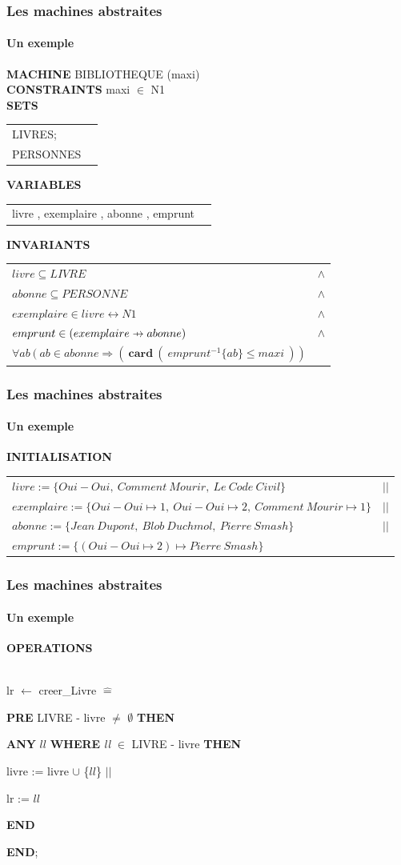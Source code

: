 \documentclass[11pt,a4paper,xcolor=table, handout]{beamer} %
\newcommand{\Bequal}{\mathrel{\widehat{=}}}
\def\p#1{\mathrel{\ooalign{\hfil$\mapstochar\mkern 5mu$\hfil\cr$#1$}}}
\def \pfun  {\p\rightarrow}
\begin{document}
\begin{frame}
\frametitle{Les machines abstraites}
\framesubtitle{Un exemple}
\setlength{\LTpre}{\medskipamount}
\setlength{\LTpost}{0pt}
\setlength\LTleft{\parindent}
\textbf{MACHINE}  BIBLIOTHEQUE (maxi) \\
\noindent\textbf{CONSTRAINTS} maxi $\in$ N1 \\
\noindent\textbf{SETS}
\begin{longtable}{ll} LIVRES; \\ PERSONNES\\ \end{longtable}
\noindent\textbf{VARIABLES}
\begin{longtable}{ll} livre , exemplaire , abonne , emprunt \end{longtable}
\noindent\textbf{INVARIANTS}
\begin{longtable}{ll}
$livre \subseteq LIVRE $ & $\wedge$ \tabularnewline
$abonne \subseteq PERSONNE$ & $\wedge$ \tabularnewline
$exemplaire \in livre \leftrightarrow N1$ & $\wedge$ \tabularnewline
$emprunt \in ( exemplaire \pfun abonne )$ & $\wedge$ \tabularnewline
$\forall ab\ (\ ab \in abonne \Rightarrow (\ \textbf{card}\ (\ emprunt ^{-1}\{ab\} \leq maxi\ ))$ &
\end{longtable}
\end{frame}

\begin{frame}
\frametitle{Les machines abstraites}
\framesubtitle{Un exemple}
\noindent\textbf{INITIALISATION}
\begin{longtable}{ll}
$livre := \{Oui-Oui,\ Comment\ Mourir,\ Le\ Code\ Civil\} $& $||$ \tabularnewline
$exemplaire := \{Oui-Oui \mapsto 1,\ Oui-Oui \mapsto 2,\ Comment\ Mourir \mapsto 1\}$ & $||$ \tabularnewline
$abonne := \{Jean\ Dupont,\ Blob\ Duchmol,\ Pierre\ Smash\} $& $||$ \tabularnewline
$emprunt := \{( Oui-Oui \mapsto 2)  \mapsto Pierre\ Smash \}$ &
\end{longtable}
\end{frame}

\begin{frame}
\frametitle{Les machines abstraites}
\framesubtitle{Un exemple}
\noindent \textbf{OPERATIONS}

~\\
\indent lr $\leftarrow$ creer\_Livre $\Bequal$

\textbf{PRE} LIVRE - livre $\neq$ $\emptyset$ \textbf{THEN}

\hspace*{1em} \textbf{ANY} $ll$ \textbf{WHERE}  \emph{ll} $\in$ LIVRE - livre \textbf{THEN} 

\hspace*{2em}  livre := livre $\cup$ \{$ll$\} $||$ 

\hspace*{2em} lr := $ll$

\hspace*{1em} \textbf{END}

\textbf{END};

\end{frame}
\end{document}
